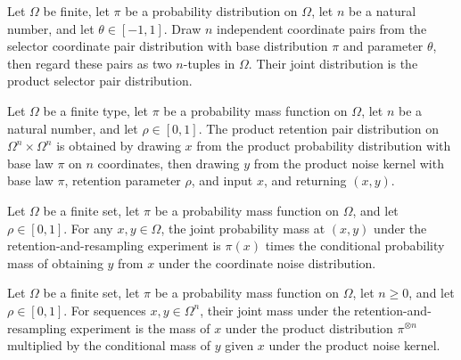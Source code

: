 \begin{definition}
\label{FABL.productSelectorPairPMF}
\leanok
{}
Let $\Omega$ be finite, let $\pi$ be a probability distribution on $\Omega$, let $n$ be
a natural number, and let $\theta\in[-1,1]$. Draw $n$ independent coordinate pairs from
the selector coordinate pair distribution with base distribution $\pi$ and parameter
$\theta$, then regard these pairs as two $n$-tuples in $\Omega$. Their joint
distribution is the product selector pair distribution.
\end{definition}

\begin{definition}
\label{FABL.productRetentionPairPMF}
\leanok
{}
Let $\Omega$ be a finite type, let $\pi$ be a probability mass function on $\Omega$, let
$n$ be a natural number, and let $\rho\in[0,1]$. The product retention pair distribution
on $\Omega^n\times\Omega^n$ is obtained by drawing $x$ from the product probability
distribution with base law $\pi$ on $n$ coordinates, then drawing $y$ from the product
noise kernel with base law $\pi$, retention parameter $\rho$, and input $x$, and
returning $(x,y)$.
\end{definition}

\begin{theorem}
\label{FABL.productRetentionCoordinatePairPMF_apply}
\leanok
{}
Let $\Omega$ be a finite set, let $\pi$ be a probability mass function on $\Omega$, and
let $\rho\in[0,1]$. For any $x,y\in\Omega$, the joint probability mass at $(x,y)$ under
the retention-and-resampling experiment is $\pi(x)$ times the conditional probability
mass of obtaining $y$ from $x$ under the coordinate noise distribution.
\end{theorem}

\begin{theorem}
\label{FABL.productRetentionPairPMF_apply}
\leanok
{}
Let $\Omega$ be a finite set, let $\pi$ be a probability mass function on $\Omega$, let
$n\ge 0$, and let $\rho\in[0,1]$. For sequences $x,y\in\Omega^n$, their joint mass under
the retention-and-resampling experiment is the mass of $x$ under the product
distribution $\pi^{\otimes n}$ multiplied by the conditional mass of $y$ given $x$ under
the product noise kernel.
\end{theorem}

